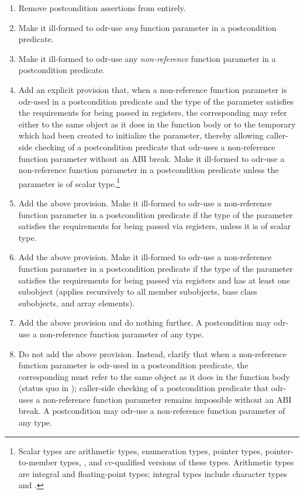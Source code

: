 \begin{enumerate}
\item Remove postcondition assertions from \cite{P2900R10} entirely.
\item Make it ill-formed to odr-use \emph{any} function parameter in a postcondition predicate.
\item Make it ill-formed to odr-use any \emph{non-reference} function parameter in a postcondition predicate.
\item  Add an explicit provision that, when a non-reference function parameter is odr-used in a postcondition predicate and the type of the parameter satisfies the requirements for being passed in registers, the corresponding  may refer either to the same object as it does in the function body or to the temporary which had been created to initialize the parameter, thereby allowing caller-side checking of a postcondition predicate that odr-uses a non-reference function parameter without an ABI break. Make it ill-formed to odr-use a non-reference function parameter in a postcondition predicate unless the parameter is of scalar type.\footnote{Scalar types are arithmetic types, enumeration types, pointer types, pointer-to-member types, , and $cv$-qualified versions of these types. Arithmetic types are integral and floating-point types; integral types include character types and .}
\item Add the above provision. Make it ill-formed to odr-use a non-reference function parameter in a postcondition predicate if the type of the parameter satisfies the requirements for being passed via registers, unless it is of scalar type.
\item Add the above provision. Make it ill-formed to odr-use a non-reference function parameter in a postcondition predicate if the type of the parameter satisfies the requirements for being passed via registers and has at least one  subobject (applies recursively to all member subobjects, base class subobjects, and array elements).
\item Add the above provision and do nothing further. A postcondition may odr-use a non-reference function parameter of any type.
\item Do not add the above provision. Instead, clarify that when a non-reference function parameter is odr-used in a postcondition predicate, the corresponding  must refer to the same object as it does in the function body (status quo in \cite{P2900R10}); caller-side checking of a postcondition predicate that odr-uses a non-reference function parameter remains impossible without an ABI break. A postcondition may odr-use a non-reference function parameter of any type.
\end{enumerate}

